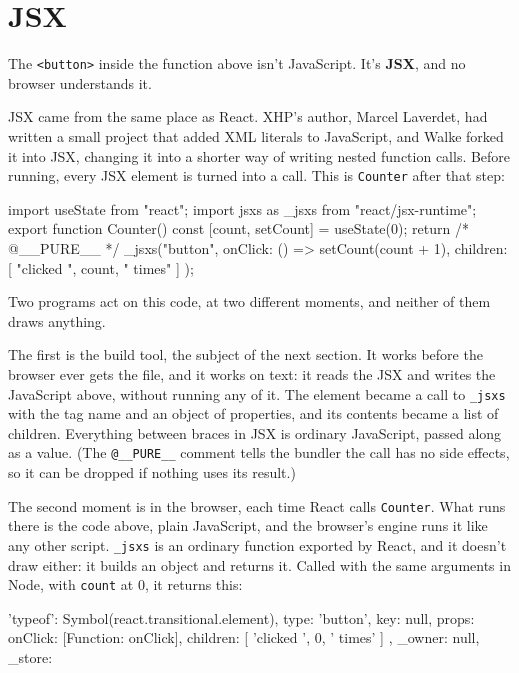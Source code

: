 \section{JSX}

The \texttt{<button>} inside the function above isn't JavaScript. It's
\textbf{JSX}, and no browser understands it.

JSX came from the same place as React. XHP's author, Marcel Laverdet, had
written a small project that added XML literals to JavaScript, and Walke forked
it into JSX, changing it into a shorter way of writing nested function calls.
Before running, every JSX element is turned into a call. This is
\texttt{Counter} after that step:

\begin{code}
import { useState } from "react";
import { jsxs as _jsxs } from "react/jsx-runtime";
export function Counter() {
  const [count, setCount] = useState(0);
  return /* @__PURE__ */ _jsxs("button", {
    onClick: () => setCount(count + 1),
    children: [
      "clicked ",
      count,
      " times"
    ]
  });
}
\end{code}

Two programs act on this code, at two different moments, and neither of them
draws anything.

The first is the build tool, the subject of the next section. It works before
the browser ever gets the file, and it works on text: it reads the JSX and
writes the JavaScript above, without running any of it. The element became a
call to \texttt{\_jsxs} with the tag name and an object of properties, and its
contents became a list of children. Everything between braces in JSX is
ordinary JavaScript, passed along as a value. (The \texttt{@\_\_PURE\_\_}
comment tells the bundler the call has no side effects, so it can be dropped if
nothing uses its result.)

The second moment is in the browser, each time React calls \texttt{Counter}.
What runs there is the code above, plain JavaScript, and the browser's engine
runs it like any other script. \texttt{\_jsxs} is an ordinary function exported
by React, and it doesn't draw either: it builds an object and returns it.
Called with the same arguments in Node, with \texttt{count} at 0, it returns
this:

\begin{terminal}[]
{
  '$$typeof': Symbol(react.transitional.element),
  type: 'button',
  key: null,
  props: {
    onClick: [Function: onClick],
    children: [ 'clicked ', 0, ' times' ]
  },
  _owner: null,
  _store: {}
}
\end{terminal}

